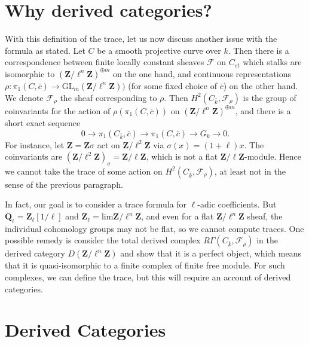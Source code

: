 \section{Why derived categories?}
\label{section-derived-categories-why}

\noindent
With this definition of the trace, let us now discuss another issue with the
formula as stated. Let $C$ be a smooth projective curve over $k$. Then there is
a correspondence between finite locally constant sheaves $\mathcal{F}$ on
$C_{et}$ which stalks are isomorphic to
${(\mathbf{Z}/\ell^n\mathbf{Z})}^{\oplus m}$ on the one hand, and continuous
representations $\rho : \pi_1 (C,\bar c) \to
\text{GL}_m(\mathbf{Z}/\ell^n\mathbf{Z}))$ (for some fixed choice of $\bar c$)
on the other hand. We denote $\mathcal{F}_\rho$ the sheaf corresponding to
$\rho$. Then $H^2 (C_{\bar k}, \mathcal{F}_\rho)$ is the group of coinvariants
for the action of $\rho(\pi_1 (C,\bar c))$ on
${(\mathbf{Z}/\ell^n\mathbf{Z})}^{\oplus m}$, and there is a short exact
sequence
$$
0 \longrightarrow \pi_1 (C_{\bar k},\bar c) \longrightarrow \pi_1 (C,\bar c)
\longrightarrow G_k \longrightarrow 0.
$$
For instance, let $\mathbf{Z} = \mathbf{Z} \sigma$ act on
$\mathbf{Z}/\ell^2\mathbf{Z}$ via $\sigma(x) = (1+\ell) x$. The coinvariants
are $(\mathbf{Z}/\ell^2\mathbf{Z})_{\sigma} = \mathbf{Z}/\ell\mathbf{Z}$, which
is not a flat $\mathbf{Z}/\ell\mathbf{Z}$-module. Hence we cannot take the
trace of some action on $H^2(C_{\bar k}, \mathcal{F}_\rho)$, at least not in
the sense of the previous paragraph.

\medskip\noindent
In fact, our goal is to consider a trace formula for $\ell$-adic coefficients.
But $\mathbf{Q}_\ell = \mathbf{Z}_\ell[1/\ell]$ and $\mathbf{Z}_\ell =
\text{lim} \mathbf{Z}/\ell^n\mathbf{Z}$, and even for a flat
$\mathbf{Z}/\ell^n\mathbf{Z}$ sheaf, the individual cohomology groups may not
be flat, so we cannot compute traces. One possible remedy is consider the total
derived complex $R\Gamma(C_{\bar k}, \mathcal{F}_\rho)$ in the derived category
$D(\mathbf{Z}/\ell^n\mathbf{Z})$ and show that it is a perfect object, which
means that it is quasi-isomorphic to a finite complex of finite free module.
For such complexes, we can define the trace, but this will require an account
of derived categories.






\section{Derived Categories}
\label{section-derived-categories}

